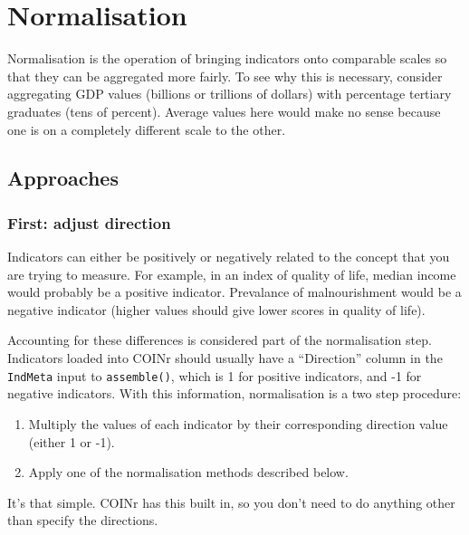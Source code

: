 \documentclass[
]{book}
\providecommand{\tightlist}{%
  \setlength{\itemsep}{0pt}\setlength{\parskip}{0pt}}
\begin{document}
\hypertarget{normalisation}{%
\chapter{Normalisation}\label{normalisation}}

Normalisation is the operation of bringing indicators onto comparable scales so that they can be aggregated more fairly. To see why this is necessary, consider aggregating GDP values (billions or trillions of dollars) with percentage tertiary graduates (tens of percent). Average values here would make no sense because one is on a completely different scale to the other.

\hypertarget{approaches}{%
\section{Approaches}\label{approaches}}

\hypertarget{first-adjust-direction}{%
\subsection{First: adjust direction}\label{first-adjust-direction}}

Indicators can either be positively or negatively related to the concept that you are trying to measure. For example, in an index of quality of life, median income would probably be a positive indicator. Prevalance of malnourishment would be a negative indicator (higher values should give lower scores in quality of life).

Accounting for these differences is considered part of the normalisation step. Indicators loaded into COINr should usually have a ``Direction'' column in the \texttt{IndMeta} input to \texttt{assemble()}, which is 1 for positive indicators, and -1 for negative indicators. With this information, normalisation is a two step procedure:

\begin{enumerate}
\def\labelenumi{\arabic{enumi}.}
\tightlist
\item
  Multiply the values of each indicator by their corresponding direction value (either 1 or -1).
\item
  Apply one of the normalisation methods described below.
\end{enumerate}

It's that simple. COINr has this built in, so you don't need to do anything other than specify the directions.
\end{document}
